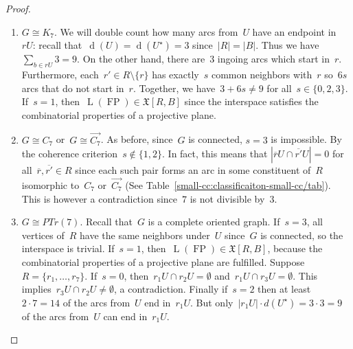 \documentclass[english,a4paper]{article}
\theoremstyle{plain}
\theoremstyle{definition}
\newcommand{\abs}[1]{| #1 |}
\newcommand{\coherentConfig}{\ensuremath{\mathfrak{X}}}
\newcommand{\interspace}[2]{\ensuremath{\coherentConfig[#1,#2]}}
\newcommand{\intDegree}[1]{\ensuremath{\Deg \left( #1 \right)}}
\DeclareMathOperator{\Deg}{d}
\newcommand{\clique}[1]{\ensuremath{K_{#1}}}
\newcommand{\cycle}[1]{\ensuremath{C_{#1}}}
\DeclareMathOperator{\fanoPlane}{FP}
\DeclareMathOperator{\LeviGraph}{L}
\newcommand{\leviGraph}[1]{\ensuremath{\LeviGraph\!\left(#1\right)}}
\newcommand{\leviFano}{\leviGraph{\fanoPlane}}
\begin{document}
\begin{proof}
    \begin{enumerate}[label=(\arabic*)]
        \item
        $G \cong \clique{7}$.
        We will double count how many arcs from~$U$ have an endpoint in~$rU$:
        recall that~$\intDegree{U} = \intDegree{U^\star} = 3$ since~$\abs{R} = \abs{B}$.
        Thus we have~$\sum_{b \in rU} 3 = 9$.
        On the other hand, there are~$3$ ingoing arcs which start in~$r$.
        Furthermore, each~$r' \in R\setminus\{r\}$ has exactly~$s$ common neighbors with~$r$ so~$6s$ arcs that do not start in~$r$.
        Together, we have~$3+6s \neq 9$ for all~$s \in \{0,2,3\}$.
        If~$s = 1$, then~$\leviFano \in \interspace{R}{B}$ since the interspace satisfies the combinatorial properties of a projective plane.

        \item
        $G \cong \cycle{7}$ or~$G \cong \overrightarrow{\cycle{7}}$.
        As before, since~$G$ is connected, $s = 3$ is impossible.
        By the coherence criterion~$s\notin \{1,2\}$.
        In fact, this means that $\abs{\overline{r}U \cap \overline{r'}U} = 0$ for all~$\overline{r},\overline{r'}\in R$ since each such pair forms an arc in some constituent of~$R$ isomorphic to~$\cycle{7}$ or~$\overrightarrow{\cycle{7}}$ (See Table~\ref{small-cc:classificaiton-small-cc/tab}). This is however a contradiction since~$7$ is not divisible by~$3$.

        \item
        $G \cong PTr(7)$. Recall that~$G$ is a complete oriented graph.
        If~$s = 3$, all vertices of~$R$ have the same neighbors under~$U$ since~$G$ is connected, so the interspace is trivial.
        If~$s = 1$, then~$\leviFano \in \interspace{R}{B}$, because the combinatorial properties of a projective plane are fulfilled. Suppose~$R = \{r_1,\dots,r_7\}$.
        If~$s = 0$, then~$r_1U \cap r_2U = \emptyset$ and~$r_1U \cap r_3U = \emptyset$.
        This implies~$r_3U \cap r_2U \neq \emptyset$, a contradiction.
        Finally if~$s=2$ then at least~$2\cdot 7=14$ of the arcs from~$U$ end in~$r_1U$.
        But only~$|r_1U|\cdot d(U^\star)= 3\cdot 3=9$ of the arcs from~$U$ can end in~$r_1U$.\qedhere
    \end{enumerate}
\end{proof}
\end{document}
